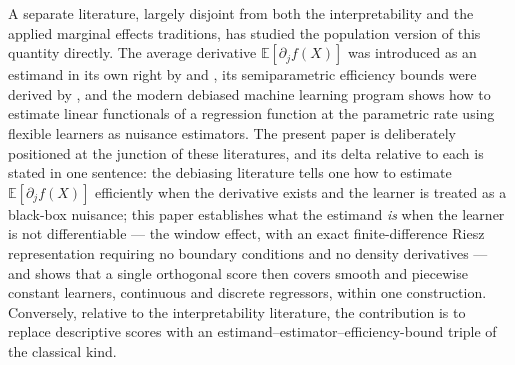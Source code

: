 \documentclass[12pt]{article}
\newcommand{\E}{\mathbb{E}}
\begin{document}
	A separate literature, largely disjoint from both the interpretability and the
	applied marginal effects traditions, has studied the population version of this
	quantity directly. The average derivative $\E[\partial_j f(X)]$ was introduced as
	an estimand in its own right by \citet{hardle1989} and \citet{powell1989}, its
	semiparametric efficiency bounds were derived by \citet{newey1993}, and the modern
	debiased machine learning program \citep{chernozhukov2018dml,
	chernozhukov2022riesz} shows how to estimate linear functionals of a regression
	function at the parametric rate using flexible learners as nuisance estimators.
	The present paper is deliberately positioned at the junction of these
	literatures, and its delta relative to each is stated in one sentence: the
	debiasing literature tells one how to estimate $\E[\partial_j f(X)]$ efficiently
	when the derivative exists and the learner is treated as a black-box nuisance;
	this paper establishes what the estimand \emph{is} when the learner is not
	differentiable --- the window effect, with an exact finite-difference Riesz
	representation requiring no boundary conditions and no density derivatives --- and
	shows that a single orthogonal score then covers smooth and piecewise constant
	learners, continuous and discrete regressors, within one construction. Conversely,
	relative to the interpretability literature, the contribution is to replace
	descriptive scores with an estimand--estimator--efficiency-bound triple of the
	classical kind.
	
\end{document}

